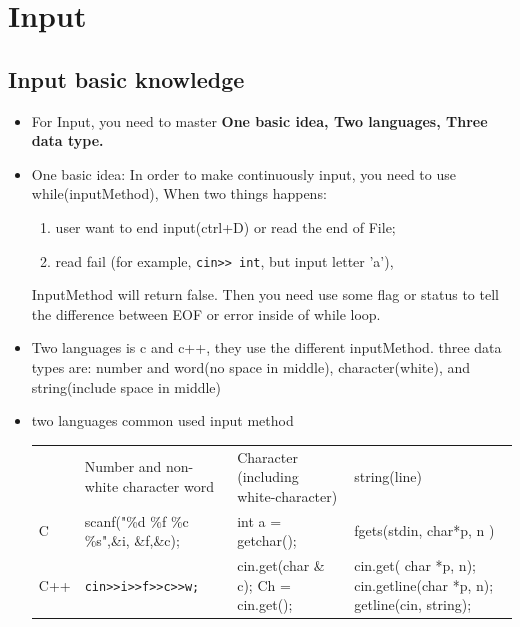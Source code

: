 \documentclass[a4paper,11pt,twoside]{book}
\renewcommand{\hline}{}
\begin{document}
\section{Input}

\subsection{Input basic knowledge}

\begin{itemize}
	\item For Input, you need to master \textbf{One basic idea, Two languages, Three data type.}
	\item One basic idea: In order to make continuously input, you need to use while(inputMethod), When two things happens:
	\begin{enumerate}
		\item user want to end input(ctrl+D) or read the end of File;
		\item read fail (for example,  \verb|cin>> int|, but input letter 'a'),
	\end{enumerate}
	
	InputMethod will return false.  Then you need use some flag or status to tell the difference between EOF or error inside of while loop.
	
	\item Two languages is c and c++, they use the different inputMethod. three data types are: number and word(no space in middle), character(white), and string(include space in middle)
	
	\item two languages common used input method \\
	\begin{tabular}{|p{}|p{}|p{}|p{}|}
		\hline
		& Number and non-white  character word & Character (including white-character) & string(line)\\
		\hline
		C &scanf("\%d \%f \%c \%s",\&i, \&f,\&c);  & int a = getchar(); & fgets(stdin, char*p, n ) \\
		\hline
		C++ & \verb|cin>>i>>f>>c>>w;| & cin.get(char \& c); \newline  Ch = cin.get(); & cin.get( char *p, n); \newline cin.getline(char *p, n); \newline getline(cin, string);
		\\
		\hline
	\end{tabular}
	

\end{itemize}
\end{document}
